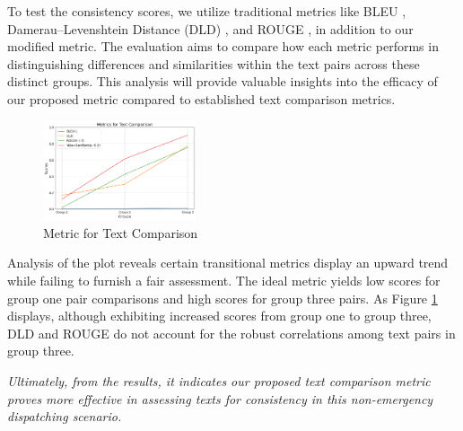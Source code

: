 To test the consistency scores, we utilize traditional metrics like BLEU \cite{papineni2002bleu}, Damerau–Levenshtein Distance (DLD) \cite{damerau1964technique}, and ROUGE \cite{lin-2004-rouge}, in addition to our modified metric. The evaluation aims to compare how each metric performs in distinguishing differences and similarities within the text pairs across these distinct groups. This analysis will provide valuable insights into the efficacy of our proposed metric compared to established text comparison metrics.

\begin{figure}[h]
    \centering
    \includegraphics[width=0.40\textwidth]{figures/line-graph.png}
    \caption{Metric for Text Comparison}
    \label{fig:textcompare}
    \vspace{-0.5cm}
\end{figure}

Analysis of the plot reveals certain transitional metrics display an upward trend while failing to furnish a fair assessment. The ideal metric yields low scores for group one pair comparisons and high scores for group three pairs. As Figure \ref{fig:textcompare} displays, although exhibiting increased scores from group one to group three, DLD and ROUGE do not account for the robust correlations among text pairs in group three.


\textit{Ultimately, from the results, it indicates our proposed text comparison metric proves more effective in assessing texts for consistency in this non-emergency dispatching scenario.}




